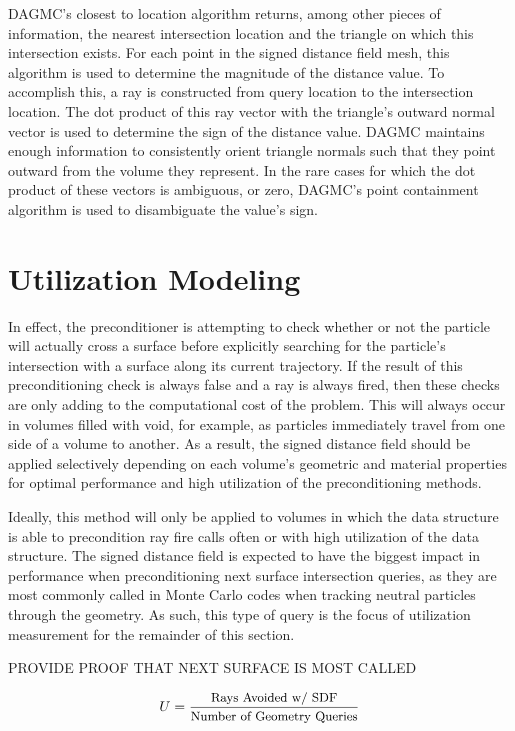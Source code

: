DAGMC's closest to location algorithm returns, among other pieces of
information, the nearest intersection location and the triangle on which this
intersection exists. For each point in the signed distance field mesh, this
algorithm is used to determine the magnitude of the distance value. To
accomplish this, a ray is constructed from query location to the intersection
location. The dot product of this ray vector with the triangle's outward normal
vector is used to determine the sign of the distance value. DAGMC maintains
enough information to consistently orient triangle normals such that they point
outward from the volume they represent. In the rare cases for which the dot
product of these vectors is ambiguous, or zero, DAGMC's point containment
algorithm is used to disambiguate the value's sign.

\section{Utilization Modeling}\label{section:preconditioner_utilization}

In effect, the preconditioner is attempting to check whether or not the particle
will actually cross a surface before explicitly searching for the particle's
intersection with a surface along its current trajectory. If the result of this
preconditioning check is always false and a ray is always fired, then these
checks are only adding to the computational cost of the problem. This will
always occur in volumes filled with void, for example, as particles immediately
travel from one side of a volume to another. As a result, the signed distance field
should be applied selectively depending on each volume's geometric and material
properties for optimal performance and high utilization of the preconditioning
methods.

Ideally, this method will only be applied to volumes in which the data
structure is able to precondition ray fire calls often or with high utilization
of the data structure. The signed distance field is expected to have the biggest
impact in performance when preconditioning next surface intersection queries, as
they are most commonly called in Monte Carlo codes when tracking neutral particles
through the geometry. As such, this type of query is the focus of utilization
measurement for the remainder of this section.

PROVIDE PROOF THAT NEXT SURFACE IS MOST CALLED

\begin{equation}
  U = \frac{ \small \text{Rays Avoided w/ SDF} }{ \small \text{Number of Geometry Queries} } 
   \label{eq:preconditioner_utilization}
\end{equation}

